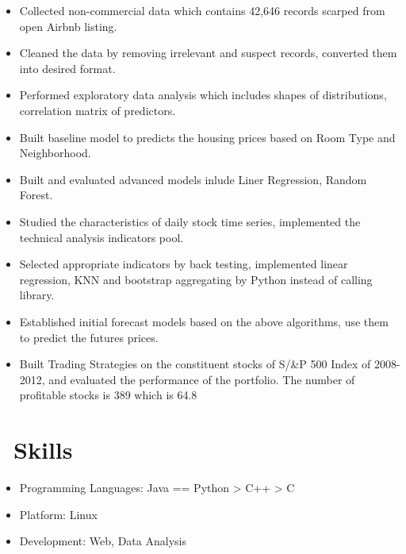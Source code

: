 \documentclass{resume}
\begin{document}
\begin{itemize}
  \item Collected non-commercial data which contains 42,646 records scarped from open Airbnb listing.
  \item Cleaned the data by removing irrelevant and suspect records, converted them into desired format.
  \item Performed exploratory data analysis which includes shapes of distributions, correlation matrix of predictors.
  \item Built baseline model to predicts the housing prices based on Room Type and Neighborhood.
  \item Built and evaluated advanced models inlude Liner Regression, Random Forest.
\end{itemize}

\begin{itemize}
  \item Studied the characteristics of daily stock time series, implemented the technical analysis indicators pool.
  \item Selected appropriate indicators by back testing, implemented linear regression, KNN and bootstrap aggregating by Python instead of calling library.
  \item Established initial forecast models based on the above algorithms, use them to predict the futures prices.
  \item Built Trading Strategies on the constituent stocks of S/&P 500 Index of 2008-2012, and evaluated the performance of the portfolio. The number of profitable stocks is 389 which is 64.8%
\end{itemize}


\section{\faCogs\ Skills}
\begin{itemize}[parsep=0.5ex]
  \item Programming Languages: Java == Python > C++ > C
  \item Platform: Linux
  \item Development: Web, Data Analysis
\end{itemize}
\end{document}
